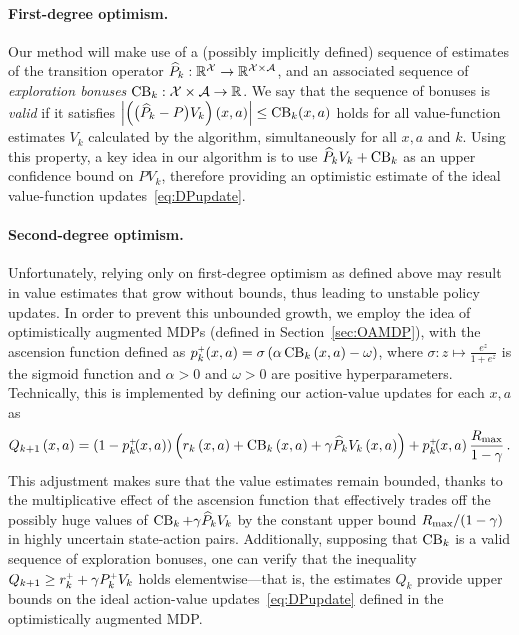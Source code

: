 \paragraph{First-degree optimism.} Our method will make use of a (possibly implicitly defined) sequence of estimates of the transition operator $\widehat{P}_k: \mathbb{R}^{\mathcal{X}}\rightarrow \mathbb{R}^{\mathcal{X}\times\mathcal{A}}$, and an associated sequence of \emph{exploration bonuses} $\operatorname{CB}_k: \mathcal{X}\times\mathcal{A} \rightarrow \mathbb{R}$. We say that the sequence of bonuses is \emph{valid} if it satisfies $\left|\left(\bigl(\widehat{P}_k - P\bigr) V_k\right)(x,a)\right| \le \operatorname{CB}_k(x,a)$ holds for all value-function estimates $V_k$ calculated by the algorithm, simultaneously for all $x,a$ and $k$. Using this property, a key idea in our algorithm is to use $\widehat{P}_k V_k + \operatorname{CB}_k$ as an upper confidence bound on $P V_k$, therefore providing an optimistic estimate of the ideal value-function updates~\eqref{eq:DPupdate}.

\paragraph{Second-degree optimism.} Unfortunately, relying only on first-degree optimism as defined above may result in value estimates that grow without bounds, thus leading to unstable policy updates. In order to prevent this unbounded growth, we employ the idea of optimistically augmented MDPs (defined in Section~\ref{sec:OAMDP}), with the ascension function defined as $p_k^{\mathsf{\scriptscriptstyle +}}(x,a) = \sigma \left( \alpha \operatorname{CB}_k \left( x, a \right) - \omega \right)$, where $\sigma: z\mapsto \frac{e^{z}}{1+e^{z}}$ is the sigmoid function and $\alpha > 0$ and $\omega > 0$ are positive hyperparameters. Technically, this is implemented by defining our action-value updates for each $x,a$ as
%
\begin{equation*}
    Q_{k+1} \left( x, a \right) = \left( 1 - p_k^{\mathsf{\scriptscriptstyle +}} \!\!\left( x, a \right) \right) \left( r_k \left( x, a \right) + \operatorname{CB}_k \left( x, a \right) + \gamma \widehat{ P}_k V_k \left( x, a \right) \right) + p_k^{\mathsf{\scriptscriptstyle +}} \!\!\left( x, a \right) \frac{R_{\max}}{1 - \gamma}\,.
\end{equation*}
%
This adjustment makes sure that the value estimates remain bounded, thanks to the multiplicative effect of the ascension function that effectively trades off the possibly huge values of $\operatorname{CB}_k + \gamma\widehat{P}_k V_k$ by the constant upper bound $R_{\max}/(1-\gamma)$ in highly uncertain state-action pairs. Additionally, supposing that $\operatorname{CB}_k$ is a valid sequence of exploration bonuses, one can verify that the inequality $Q_{k+1}  \ge r_k^{\mathsf{\scriptscriptstyle +}} + \gamma P_k^{\mathsf{\scriptscriptstyle +}} V_k$ holds elementwise---that is, the estimates $Q_k$ provide upper bounds on the ideal action-value updates~\eqref{eq:DPupdate} defined in the optimistically augmented MDP.


